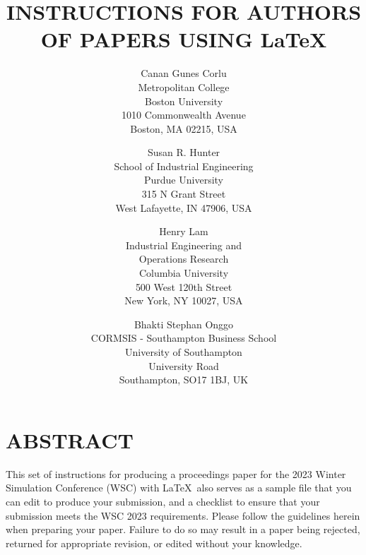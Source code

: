 \documentclass{wscpaperproc}
\theoremstyle{wsc}
\begin{document}
%
%

\title{INSTRUCTIONS FOR AUTHORS OF PAPERS USING \LaTeX}

\author{Canan Gunes Corlu\\[12pt]
	Metropolitan College\\
	Boston University\\
	1010 Commonwealth Avenue\\
	Boston, MA 02215, USA\\
\and
Susan R. Hunter\\[12pt]
School of Industrial Engineering\\
Purdue University\\
315 N Grant Street\\
West Lafayette, IN 47906, USA\\
\and
Henry Lam\\ [12pt]
Industrial Engineering and\\
Operations Research\\
Columbia University\\
500 West 120th Street\\
New York, NY 10027, USA\\
\and
Bhakti Stephan Onggo\\ [12pt]
CORMSIS - Southampton Business School\\
University of Southampton\\
University Road\\
Southampton, SO17 1BJ, UK\\
}



\maketitle

\section*{ABSTRACT}
This set of instructions for producing a proceedings paper for the 2023 Winter Simulation Conference (WSC) with \LaTeX\ also serves as a sample file that you can edit to produce your submission, and a checklist to ensure that your submission meets the WSC 2023 requirements. Please follow the guidelines herein when preparing your paper. Failure to do so may result in a paper being rejected, returned for appropriate revision, or edited without your knowledge.
\end{document}
